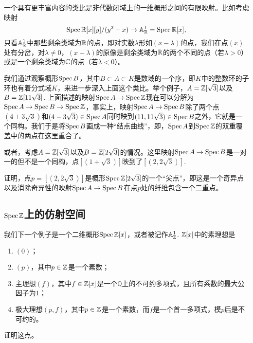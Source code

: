 
一个具有更丰富内容的类比是非代数闭域上的一维概形之间的有限映射。比如考虑映射
\[
	\operatorname{Spec} \mathbb{R}[x][y]/(y^2-x)\to \mathbb{A}_{\mathbb{R}}^1=\operatorname{Spec} \mathbb{R}[x],
\]
只看$\mathbb{A}_{\mathbb{R}}^1$中那些剩余类域为$\mathbb{R}$的点，即对实数$\lambda$形如$(x-\lambda)$的点，我们在点$(x)$处有分岔，对$\lambda\neq 0$，$(x-\lambda)$的原像是剩余类域为$\mathbb{R}$的两个不同的点（若$\lambda>0$）或是一个剩余类域为$\mathbb{C}$的点（若$\lambda<0$）。

我们通过观察概形$\operatorname{Spec} B$，其中$B\subset A\subset K$是数域的一个序，即$K$中的整数环的子环也有着分式域$K$，来进一步深入上面这个类比。举个例子，$A=\mathbb{Z}[\sqrt 3]$以及$B=\mathbb{Z}[11\sqrt 3]$. 上面描述的映射$\operatorname{Spec} A\to \operatorname{Spec} \mathbb{Z}$现在可以分解为$\operatorname{Spec} A\to \operatorname{Spec} B\to \operatorname{Spec} \mathbb{Z}$，事实上，映射$\operatorname{Spec} A\to \operatorname{Spec} B$除了两个点$(4+3\sqrt 3)$和$(4-3\sqrt 3)\in \operatorname{Spec} A$同时映到$(11,11\sqrt 3)\in\operatorname{Spec} B$之外，它就是一个同构。我们于是将$\operatorname{Spec} B$画成一种“结点曲线”，即，$\operatorname{Spec} A$到$\operatorname{Spec} \mathbb{Z}$的双重覆盖中的两点在这里重合了。


或者，考虑$A=\mathbb{Z}[\sqrt 3]$以及$B=\mathbb{Z}[2\sqrt 3]$的情况。这里映射$\operatorname{Spec} A\to\operatorname{Spec} B$是一对一的但不是一个同构，点$[(1+\sqrt 3)]$映到了$[(2,2\sqrt{3})]$.

\begin{exe}
	证明，点$p=[(2,2\sqrt{3})]$是概形$\operatorname{Spec} \mathbb{Z}[2\sqrt 3]$的一个“尖点”，即这是一个奇异点以及消除奇异性的映射$\operatorname{Spec} A\to \operatorname{Spec} B$在点$p$处的纤维包含一个二重点。
\end{exe}

\subsection{$\operatorname{Spec} \mathbb{Z}$上的仿射空间}

我们下一个例子是一个二维概形$\operatorname{Spec} \mathbb{Z}[x]$，或者被记作$\mathbb{A}_{\mathbb{Z}}^1$. $\mathbb{Z}[x]$中的素理想是
\begin{enumerate}[{(i)}]\setlength{\itemsep}{0pt}
	\item $(0)$；
	\item $(p)$，其中$p\in\mathbb{Z}$是一个素数；
	\item 主理想$(f)$，其中$f\in\mathbb{Z}[x]$是一个$\mathbb{Q}$上的不可约多项式，且所有系数的最大公因子为$1$；
	\item 极大理想$(p,f)$，其中$p\in \mathbb{Z}$是一个素数，而$f$是一个首一多项式，模$p$后是不可约的。
\end{enumerate}

\begin{exe}
	证明这点。
\end{exe}

